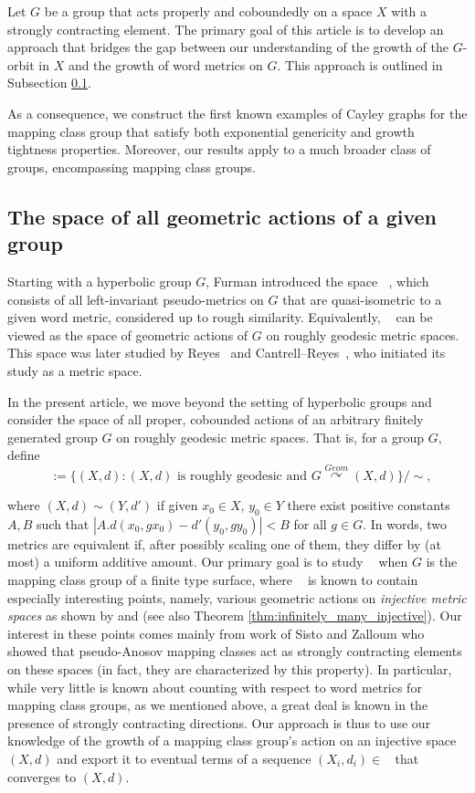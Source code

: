 \documentclass{amsart}
\numberwithin{thm}{section}
\numberwithin{figure}{section}
\theoremstyle{definition}
\theoremstyle{definition}
\theoremstyle{remark}
\numberwithin{equation}{section}
\DeclareMathOperator{\DDG}{\mathcal{D}(G)}
\theoremstyle{plain}
\begin{document}
Let $G$ be a group that acts properly and coboundedly on a space $X$ with a strongly contracting element. The primary goal of this article is to develop an approach that bridges the gap between our understanding of the growth of the $G$-orbit in $X$ and the growth of word metrics on $G$. This approach is outlined in Subsection \ref{subsection:approach}.

As a consequence, we construct the first known examples of Cayley graphs for the mapping class group that satisfy both exponential genericity and growth tightness properties. Moreover, our results apply to a much broader class of groups, encompassing mapping class groups.




\subsection{The space of all geometric actions of a given group}\label{subsection:approach}


Starting with a hyperbolic group $G$, Furman \cite{Fur02:Coarse} introduced the space $\DDG$, which consists of all left-invariant pseudo-metrics on $G$ that are quasi-isometric to a given word metric, considered up to rough similarity. Equivalently, $\DDG$ can be viewed as the space of geometric actions of $G$ on roughly geodesic metric spaces. This space was later studied by Reyes~\cite{OR22:SpaceMetric} and Cantrell–Reyes~\cite{COR22:Manhattan}, who initiated its study as a metric space. 

In the present article, we move beyond the setting of hyperbolic groups and consider the space of all proper, cobounded actions of an arbitrary finitely generated group $G$ on roughly geodesic metric spaces. That is, for a group $G,$ define
\[\DDG:=\{(X,d): (X,d) \text{ is roughly geodesic and }G\stackrel{Geom}{\curvearrowright}(X,d)
\}/ \sim,\]

where $(X,d) \sim (Y,d')$ if given $x_0 \in X$, $y_0 \in Y$ there exist positive constants $A,B$ such that $|A.d(x_0,gx_0)-d'(y_0,gy_0)|<B$ for all $g \in G$. In words, two metrics are equivalent if, after possibly scaling one of them, they differ by (at most) a uniform additive amount. Our primary goal is to study $\DDG$ when  $G$ is the mapping class group of a finite type surface, where $\DDG$ is known to contain especially interesting points, namely, various geometric actions on \emph{injective metric spaces} as shown by \cite{haettelhodapetyt:coarse} and \cite{PetytZalloum24} (see also Theorem \ref{thm:infinitely_many_injective}). Our interest in these points comes mainly from work of Sisto and Zalloum \cite{SistoZalloum2024} who showed that pseudo-Anosov mapping classes act as strongly contracting elements on these spaces (in fact, they are characterized by this property). In particular, while very little is known about counting with respect to word metrics for mapping class groups, as we mentioned above, a great deal is known in the presence of strongly contracting directions. Our approach is thus to use our knowledge of the growth of a mapping class group's action on an injective space $(X,d)$ and export it to eventual terms of a sequence $(X_i,d_i) \in \DDG$ that converges to $(X,d)$.
\end{document}
